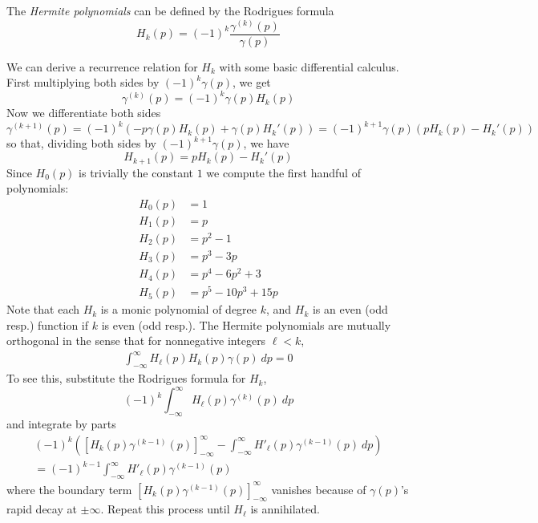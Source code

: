 
\begin{definition}
  The \emph{Hermite polynomials} can be defined by the Rodrigues formula
  \[
      H_k(p) = {(-1)}^k \frac{\gamma^{(k)}(p)}{\gamma(p)}
  \]
  
\end{definition}

We can derive a recurrence relation for $H_k$ with some basic differential calculus. First multiplying both sides by $(-1)^k \gamma(p)$, we get
\[
   \gamma^{(k)}(p) = {(-1)}^k \gamma(p)H_k(p)
\]
Now we differentiate both sides 
\[
  \gamma^{(k+1)}(p) 
    = {(-1)}^{k} (-p \gamma(p) H_k(p) + \gamma(p)H_k'(p)) 
    = {(-1)}^{k+1} \gamma(p)(pH_k(p) - H_k'(p))
\]
so that, dividing both sides by ${(-1)}^{k+1} \gamma(p)$, we have
\[
  H_{k+1}(p) = pH_k(p) - H_k'(p)
\]
Since $H_0(p)$ is trivially the constant $1$ we compute the first handful of polynomials:
\begin{align*}
  H_0(p) &= 1 \\
  H_1(p) &= p \\
  H_2(p) &= p^2 - 1 \\
  H_3(p) &= p^3 - 3p \\
  H_4(p) &= p^4 - 6p^2 + 3 \\
  H_5(p) &= p^5 - 10p^3 + 15p
\end{align*}
Note that each $H_k$ is a monic polynomial of  degree $k$, and $H_k$ is an even (odd resp.) function if $k$ is even (odd resp.).
The Hermite polynomials are mutually orthogonal in the sense that for nonnegative integers $\ell < k$,
\begin{align}\label{eq:HOrth}
  \int_{-\infty}^\infty H_\ell(p) H_k(p) \gamma(p)~dp 
  = 0
\end{align}
To see this, substitute the Rodrigues formula for $H_k$,
\[
  (-1)^k \int_{-\infty}^\infty H_\ell(p) \gamma^{(k)}(p)~dp
\]
and integrate by parts
\begin{align*}
  (-1)^k \left(\left[H_k(p)\gamma^{(k-1)}(p)\right]_{-\infty}^\infty - \int_{-\infty}^\infty H'_\ell(p) \gamma^{(k-1)}(p)~dp\right) \\
  = (-1)^{k-1}\int_{-\infty}^\infty H'_\ell(p) \gamma^{(k-1)}(p)
\end{align*}
where the boundary term $\left[H_k(p)\gamma^{(k-1)}(p)\right]_{-\infty}^\infty$ vanishes because of $\gamma(p)$'s rapid decay at $\pm \infty$. Repeat this process until $H_\ell$ is annihilated.

